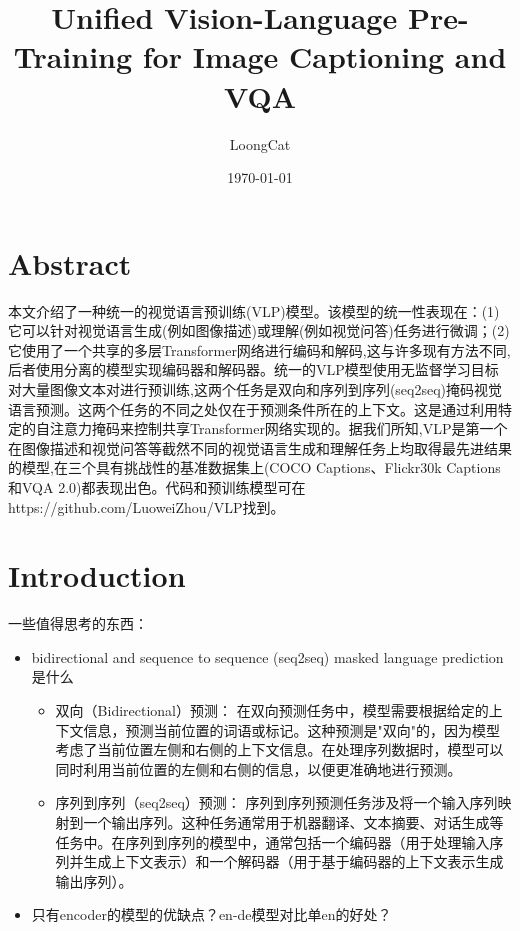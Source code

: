\documentclass{article}
\title{Unified Vision-Language Pre-Training for Image Captioning and VQA}
\author{LoongCat}
\date{\today}
\begin{document}
\begin{sloppypar}
      \maketitle
      \newpage
      \begin{spacing}{1}
            {\small \tableofcontents}
      \end{spacing}


      \newpage



      \section{Abstract}

      本文介绍了一种统一的视觉语言预训练(VLP)模型。该模型的统一性表现在：(1)它可以针对视觉语言生成(例如图像描述)或理解(例如视觉问答)任务进行微调；(2)它使用了一个共享的多层Transformer网络进行编码和解码,这与许多现有方法不同,后者使用分离的模型实现编码器和解码器。统一的VLP模型使用无监督学习目标对大量图像文本对进行预训练,这两个任务是双向和序列到序列(seq2seq)掩码视觉语言预测。这两个任务的不同之处仅在于预测条件所在的上下文。这是通过利用特定的自注意力掩码来控制共享Transformer网络实现的。据我们所知,VLP是第一个在图像描述和视觉问答等截然不同的视觉语言生成和理解任务上均取得最先进结果的模型,在三个具有挑战性的基准数据集上(COCO Captions、Flickr30k Captions和VQA 2.0)都表现出色。代码和预训练模型可在https://github.com/LuoweiZhou/VLP找到。
      \section{Introduction}

      一些值得思考的东西：
      \begin{itemize}
            \item bidirectional and sequence to sequence (seq2seq) masked language prediction是什么
                  \begin{itemize}
                        \item 双向（Bidirectional）预测：
                              在双向预测任务中，模型需要根据给定的上下文信息，预测当前位置的词语或标记。这种预测是"双向"的，因为模型考虑了当前位置左侧和右侧的上下文信息。在处理序列数据时，模型可以同时利用当前位置的左侧和右侧的信息，以便更准确地进行预测。

                        \item 序列到序列（seq2seq）预测：
                              序列到序列预测任务涉及将一个输入序列映射到一个输出序列。这种任务通常用于机器翻译、文本摘要、对话生成等任务中。在序列到序列的模型中，通常包括一个编码器（用于处理输入序列并生成上下文表示）和一个解码器（用于基于编码器的上下文表示生成输出序列）。
                  \end{itemize}
            \item 只有encoder的模型的优缺点？en-de模型对比单en的好处？


\end{itemize}
\end{sloppypar}
\end{document}
